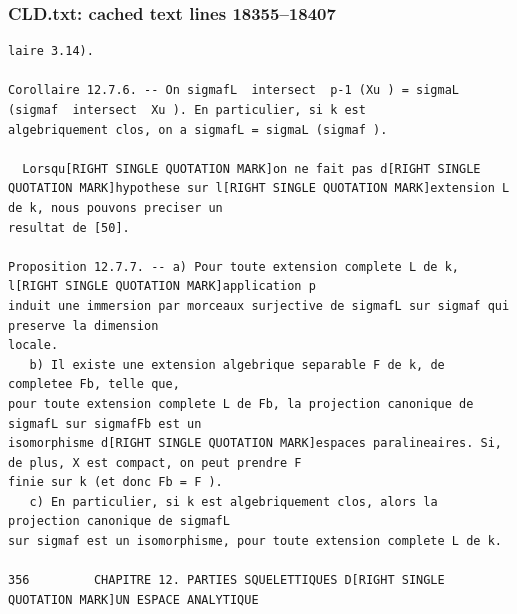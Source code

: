 \documentclass[
  11pt,
]{article}
\begin{document}
\subsubsection{CLD.txt: cached text lines
18355--18407}\label{cld.txt-cached-text-lines-1835518407}

\begin{lstlisting}
laire 3.14).

Corollaire 12.7.6. -- On sigmafL  intersect  p-1 (Xu ) = sigmaL (sigmaf  intersect  Xu ). En particulier, si k est
algebriquement clos, on a sigmafL = sigmaL (sigmaf ).

  Lorsqu[RIGHT SINGLE QUOTATION MARK]on ne fait pas d[RIGHT SINGLE QUOTATION MARK]hypothese sur l[RIGHT SINGLE QUOTATION MARK]extension L de k, nous pouvons preciser un
resultat de [50].

Proposition 12.7.7. -- a) Pour toute extension complete L de k, l[RIGHT SINGLE QUOTATION MARK]application p
induit une immersion par morceaux surjective de sigmafL sur sigmaf qui preserve la dimension
locale.
   b) Il existe une extension algebrique separable F de k, de completee Fb, telle que,
pour toute extension complete L de Fb, la projection canonique de sigmafL sur sigmafFb est un
isomorphisme d[RIGHT SINGLE QUOTATION MARK]espaces paralineaires. Si, de plus, X est compact, on peut prendre F
finie sur k (et donc Fb = F ).
   c) En particulier, si k est algebriquement clos, alors la projection canonique de sigmafL
sur sigmaf est un isomorphisme, pour toute extension complete L de k.

356         CHAPITRE 12. PARTIES SQUELETTIQUES D[RIGHT SINGLE QUOTATION MARK]UN ESPACE ANALYTIQUE


\end{lstlisting}
\end{document}
